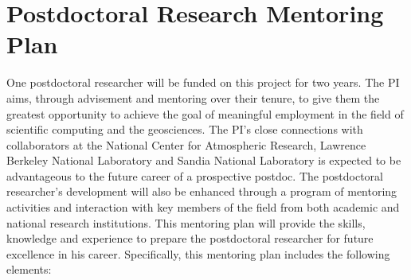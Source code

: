 \documentclass[11pt]{article}
\begin{document}
\thispagestyle{empty}

\appendix

\setcounter{section}{9}

\section{Postdoctoral Research Mentoring Plan}

One postdoctoral researcher will be funded on this project for two years.  The PI aims, through advisement and mentoring over their tenure, to give them the greatest opportunity to achieve the goal of meaningful employment in the field of scientific computing and the geosciences.  The PI's close connections with collaborators at the National Center for Atmospheric Research, Lawrence Berkeley National Laboratory and Sandia National Laboratory is expected to be advantageous to the future career of a prospective postdoc.  The postdoctoral researcher's development will also be enhanced through a program of mentoring activities and interaction with key members of the field from both academic and national research institutions.  This mentoring plan will provide the skills, knowledge and experience to prepare the postdoctoral researcher for future excellence in his career.  Specifically, this mentoring plan includes the following elements:
\end{document}
